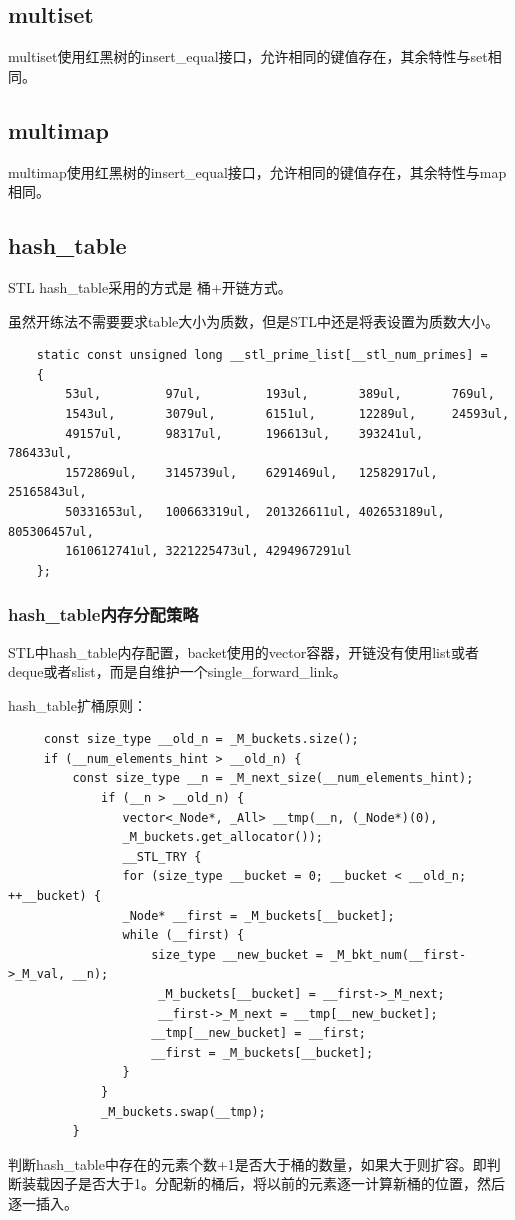 \documentclass[a4paper,fontset=mac]{ctexart}
\begin{document}
	\subsection{multiset}
	multiset使用红黑树的insert\_equal接口，允许相同的键值存在，其余特性与set相同。
	
	\subsection{multimap}
	multimap使用红黑树的insert\_equal接口，允许相同的键值存在，其余特性与map相同。
	
	\subsection{hash\_table}
	STL hash\_table采用的方式是 {\color{red}桶+开链}方式。
	
	虽然开练法不需要要求table大小为质数，但是STL中还是将表设置为质数大小。
	\begin{lstlisting}
	static const unsigned long __stl_prime_list[__stl_num_primes] =
	{
		53ul,         97ul,         193ul,       389ul,       769ul,
		1543ul,       3079ul,       6151ul,      12289ul,     24593ul,
		49157ul,      98317ul,      196613ul,    393241ul,    786433ul,
		1572869ul,    3145739ul,    6291469ul,   12582917ul,  25165843ul,
		50331653ul,   100663319ul,  201326611ul, 402653189ul, 805306457ul, 
		1610612741ul, 3221225473ul, 4294967291ul
	};
	\end{lstlisting}
	
	\subsubsection{hash\_table内存分配策略}
	 STL中hash\_table内存配置，backet使用的vector容器，开链没有使用list或者deque或者slist，而是自维护一个single\_forward\_link。
	 
	 hash\_table扩桶原则：
	 \begin{lstlisting}
	 const size_type __old_n = _M_buckets.size();
	 if (__num_elements_hint > __old_n) {
		 const size_type __n = _M_next_size(__num_elements_hint);
			 if (__n > __old_n) {
			 	vector<_Node*, _All> __tmp(__n, (_Node*)(0),
			 	_M_buckets.get_allocator());
			 	__STL_TRY {
			 	for (size_type __bucket = 0; __bucket < __old_n; ++__bucket) {
			 	_Node* __first = _M_buckets[__bucket];
			 	while (__first) {
			 		size_type __new_bucket = _M_bkt_num(__first->_M_val, __n);
					 _M_buckets[__bucket] = __first->_M_next;
					 __first->_M_next = __tmp[__new_bucket];
			 		__tmp[__new_bucket] = __first;
			 		__first = _M_buckets[__bucket];          
			 	}
			 }
			 _M_buckets.swap(__tmp);
		 }
	 \end{lstlisting}
	 判断hash\_table中存在的元素个数+1是否大于桶的数量，如果大于则扩容。即判断装载因子是否大于1。分配新的桶后，将以前的元素逐一计算新桶的位置，然后逐一插入。
	 
\end{document}
